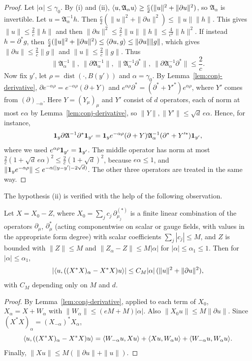 \begin{proof}
Let $|\alpha|\le\gamma_0$. By (i) and (ii), $\langle u,\mathfrak A_\alpha u\rangle\ge\frac c2(\|u\|^2+\|\partial u\|^2)$, so $\mathfrak A_\alpha$ is invertible. Let $u=\mathfrak A_\alpha^{-1}h$. Then $\frac c2(\|u\|^2+\|\partial u\|^2)\le\|u\|\|h\|$. This gives $\|u\|\le\frac2c\|h\|$ and then $\|\partial u\|^2\le\frac2c\|u\|\|h\|\le\frac4{c^2}\|h\|^2$. If instead $h=\partial^*g$, then $\frac c2(\|u\|^2+\|\partial u\|^2)\le\langle \partial u,g\rangle\le\|\partial u\|\|g\|$, which gives $\|\partial u\|\le\frac2c\|g\|$ and $\|u\|\le\frac2c\|g\|$. Thus
\[
\|\mathfrak A_\alpha^{-1}\|,\ \|\partial\mathfrak A_\alpha^{-1}\|,\ \|\mathfrak A_\alpha^{-1}\partial^*\|,\ \|\partial\mathfrak A_\alpha^{-1}\partial^*\|\le\frac2c .
\]
Now fix $y'$, let $\rho=\operatorname{dist}(\cdot,B(y'))$ and $\alpha=\gamma_0$. By Lemma~\ref{lem:conj-derivative}, $\partial e^{-\alpha\rho}=e^{-\alpha\rho}(\partial+Y)$ and $e^{\alpha\rho}\partial^*=(\partial^*+Y'^{*})e^{\alpha\rho}$, where $Y'$ comes from $(\partial)_{-\alpha}$. Here $Y=(Y_\mu)_\mu$ and $Y'$ consist of $d$ operators, each of norm at most $e\alpha$ by Lemma~\ref{lem:conj-derivative}, so $\|Y\|,\|Y'\|\le\sqrt d\,e\alpha$. Hence, for instance,
\[
\mathbf 1_y\partial\mathfrak A^{-1}\partial^*\mathbf 1_{y'}=\mathbf 1_ye^{-\alpha\rho}(\partial+Y)\mathfrak A_\alpha^{-1}(\partial^*+Y'^*)\mathbf 1_{y'},
\]
where we used $e^{\alpha\rho}\mathbf 1_{y'}=\mathbf 1_{y'}$. The middle operator has norm at most $\frac2c(1+\sqrt d\,e\alpha)^2\le\frac2c(1+\sqrt d)^2$, because $e\alpha\le1$, and $\|\mathbf 1_ye^{-\alpha\rho}\|\le e^{-\alpha(|y-y'|-2\sqrt d)}$. The other three operators are treated in the same way.
\end{proof}

The hypothesis (ii) is verified with the help of the following observation.

\begin{lemma}\label{lem:conj-forms}
Let $X=X_0-Z$, where $X_0=\sum_jc_j\,\partial^{(*)}_{\mu_j}$ is a finite linear combination of the operators $\partial_\mu$, $\partial^*_\mu$ (acting componentwise on scalar or gauge fields, with values in the appropriate form degree) with scalar coefficients $\sum_j|c_j|\le M$, and $Z$ is bounded with $\|Z\|\le M$ and $\|Z_\alpha-Z\|\le M|\alpha|$ for $|\alpha|\le\alpha_1\le1$. Then for $|\alpha|\le\alpha_1$,
\[
|\langle u,((X^*X)_\alpha-X^*X)u\rangle|\le C_M|\alpha|\,(\|u\|^2+\|\partial u\|^2),
\]
with $C_M$ depending only on $M$ and $d$.
\end{lemma}

\begin{proof}
By Lemma~\ref{lem:conj-derivative}, applied to each term of $X_0$, $X_\alpha=X+W_\alpha$ with $\|W_\alpha\|\le(eM+M)|\alpha|$. Also $\|X_0u\|\le M\|\partial u\|$. Since $(X^*X)_\alpha=(X_{-\alpha})^*X_\alpha$,
\[
\langle u,((X^*X)_\alpha-X^*X)u\rangle=\langle W_{-\alpha}u,Xu\rangle+\langle Xu,W_\alpha u\rangle+\langle W_{-\alpha}u,W_\alpha u\rangle.
\]
Finally, $\|Xu\|\le M(\|\partial u\|+\|u\|)$.
\end{proof}
